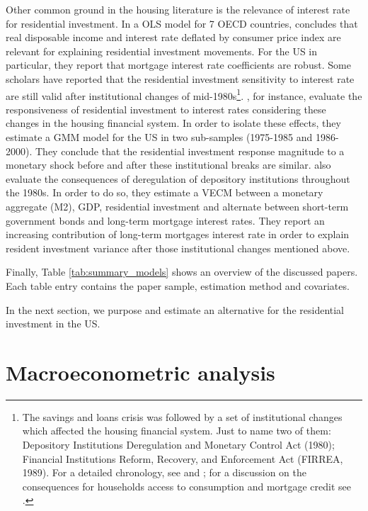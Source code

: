 \documentclass[12pt, a4paper]{article}
\begin{document}
Other common ground in the housing literature is the relevance of interest rate for residential investment.
In a OLS model for 7 OECD countries, \textcite{egebo_1990_MODEL} concludes that real disposable income and interest rate deflated by consumer price index are relevant for explaining residential investment movements.
For the US in particular, they report that mortgage interest rate coefficients are robust.
Some scholars have reported that the residential investment sensitivity to interest rate are still valid after institutional changes of mid-1980s\footnote{The savings and loans crisis was followed by a set of institutional changes which affected the housing financial system. Just to name two of them: Depository Institutions Deregulation and Monetary Control Act (1980); Financial Institutions Reform, Recovery, and Enforcement Act (FIRREA, 1989). For a detailed chronology, see  \textcite[Appendix B]{mccarthyMonetaryPolicyTransmission2002} and \textcite{green_american_2005}; for a discussion on the consequences for households access to consumption and mortgage credit see \textcite{federal_deposit_insurance_corporation_savings_1997,wall_too_2010}.}.
\textcite{mccarthyMonetaryPolicyTransmission2002}, for instance, evaluate the responsiveness of residential investment to interest rates considering these changes in the housing financial system.
In order to isolate these effects, they estimate  a GMM model for the US in two sub-samples (1975-1985 and 1986-2000).
They conclude that the residential investment response magnitude to a monetary shock before and after these institutional breaks are similar.
\textcite{gauger_residential_2003} also evaluate the consequences of deregulation of depository institutions throughout the 1980s.
In order to do so, they estimate a VECM between a monetary aggregate (M2), GDP, residential investment and alternate between short-term government bonds and long-term mortgage interest rates.
They report an increasing contribution of long-term mortgages interest rate in order to explain resident investment variance after those institutional changes mentioned above.


Finally, Table \ref{tab:summary_models} shows an overview of the discussed papers.
Each table entry contains the paper sample, estimation method and covariates.

In the next section, we purpose and estimate an alternative for the residential investment in the US.




\section{Macroeconometric analysis}
\label{sec:org81b3c99}
\label{sec:VECM}
\end{document}
